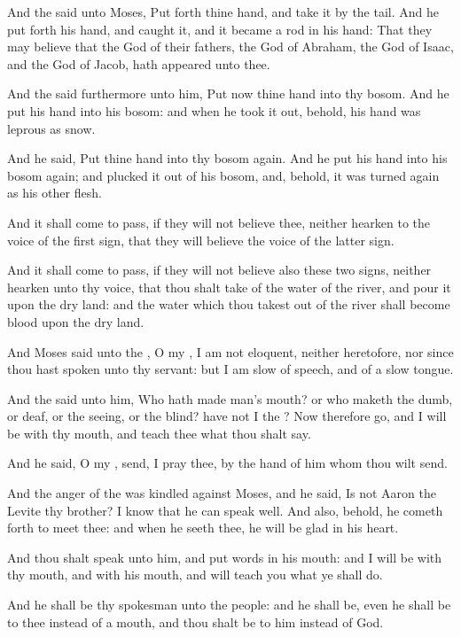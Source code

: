 \verse And the \LORD said unto Moses, Put forth thine hand, and take it by the tail. And he put forth his hand, and caught it, and it became a rod in his hand: \verse That they may believe that the \LORD God of their fathers, the God of Abraham, the God of Isaac, and the God of Jacob, hath appeared unto thee.

\verse And the \LORD said furthermore unto him, Put now thine hand into thy bosom. And he put his hand into his bosom: and when he took it out, behold, his hand was leprous as snow.

\verse And he said, Put thine hand into thy bosom again. And he put his hand into his bosom again; and plucked it out of his bosom, and, behold, it was turned again as his other flesh.

\verse And it shall come to pass, if they will not believe thee, neither hearken to the voice of the first sign, that they will believe the voice of the latter sign.

\verse And it shall come to pass, if they will not believe also these two signs, neither hearken unto thy voice, that thou shalt take of the water of the river, and pour it upon the dry land: and the water which thou takest out of the river shall become blood upon the dry land.

\verse And Moses said unto the \LORD, O my \LORD, I am not eloquent, neither heretofore, nor since thou hast spoken unto thy servant: but I am slow of speech, and of a slow tongue.

\verse And the \LORD said unto him, Who hath made man's mouth? or who maketh the dumb, or deaf, or the seeing, or the blind? have not I the \LORD?  \verse Now therefore go, and I will be with thy mouth, and teach thee what thou shalt say.

\verse And he said, O my \LORD, send, I pray thee, by the hand of him whom thou wilt send.

\verse And the anger of the \LORD was kindled against Moses, and he said, Is not Aaron the Levite thy brother? I know that he can speak well.  And also, behold, he cometh forth to meet thee: and when he seeth thee, he will be glad in his heart.

\verse And thou shalt speak unto him, and put words in his mouth: and I will be with thy mouth, and with his mouth, and will teach you what ye shall do.

\verse And he shall be thy spokesman unto the people: and he shall be, even he shall be to thee instead of a mouth, and thou shalt be to him instead of God.

